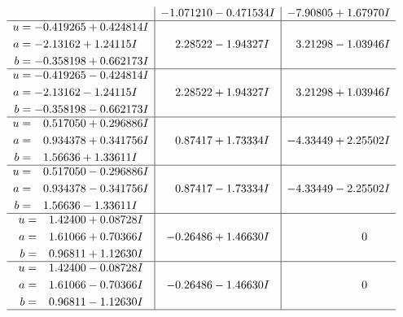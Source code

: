 \documentclass[1p]{elsarticle_modified}
\theoremstyle{definition}
\begin{document}
$$\begin{array}{c|c|c}
 & -1.071210 - 0.471534 I & -7.90805 + 1.67970 I \\ \hline\begin{aligned}
u &= -0.419265 + 0.424814 I \\
a &= -2.13162 + 1.24115 I \\
b &= -0.358198 + 0.662173 I\end{aligned}
 & \phantom{-}2.28522 - 1.94327 I & \phantom{-}3.21298 - 1.03946 I \\ \hline\begin{aligned}
u &= -0.419265 - 0.424814 I \\
a &= -2.13162 - 1.24115 I \\
b &= -0.358198 - 0.662173 I\end{aligned}
 & \phantom{-}2.28522 + 1.94327 I & \phantom{-}3.21298 + 1.03946 I \\ \hline\begin{aligned}
u &= \phantom{-}0.517050 + 0.296886 I \\
a &= \phantom{-}0.934378 + 0.341756 I \\
b &= \phantom{-}1.56636 + 1.33611 I\end{aligned}
 & \phantom{-}0.87417 + 1.73334 I & -4.33449 + 2.25502 I \\ \hline\begin{aligned}
u &= \phantom{-}0.517050 - 0.296886 I \\
a &= \phantom{-}0.934378 - 0.341756 I \\
b &= \phantom{-}1.56636 - 1.33611 I\end{aligned}
 & \phantom{-}0.87417 - 1.73334 I & -4.33449 - 2.25502 I \\ \hline\begin{aligned}
u &= \phantom{-}1.42400 + 0.08728 I \\
a &= \phantom{-}1.61066 + 0.70366 I \\
b &= \phantom{-}0.96811 + 1.12630 I\end{aligned}
 & -0.26486 + 1.46630 I & \phantom{-0.000000 } 0 \\ \hline\begin{aligned}
u &= \phantom{-}1.42400 - 0.08728 I \\
a &= \phantom{-}1.61066 - 0.70366 I \\
b &= \phantom{-}0.96811 - 1.12630 I\end{aligned}
 & -0.26486 - 1.46630 I & \phantom{-0.000000 } 0\\
 \hline 
 \end{array}$$\newpage$$\begin{array}{c|c|c}  

\end{array}$$
\end{document}
